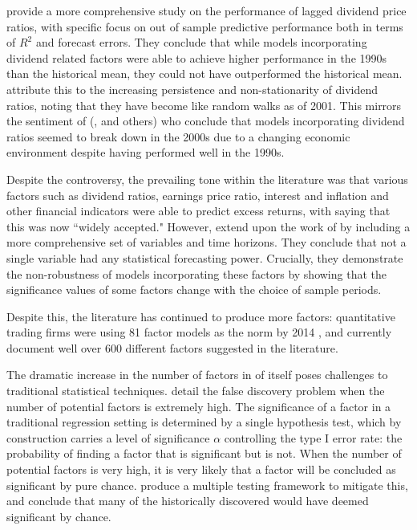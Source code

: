 \documentclass[a4paper, table]{article}
\begin{document}
\cite{goyal_predicting_2003} provide a more comprehensive study on the performance of lagged dividend price ratios, with specific focus on out of sample predictive performance both in terms of $R^2$ and forecast errors. They conclude that while models incorporating dividend related factors were able to achieve higher performance in the 1990s than the historical mean, they could not have outperformed the historical mean. \cite{goyal_predicting_2003} attribute this to the increasing persistence and non-stationarity of dividend ratios, noting that they have become like random walks as of 2001. This mirrors the sentiment of (\cite{lettau_consumption_2001}, \cite{schwert_anomalies_2003} and others) who conclude that models incorporating dividend ratios seemed to break down in the 2000s due to a changing economic environment despite having performed well in the 1990s.

Despite the controversy, the prevailing tone within the literature was that various factors such as dividend ratios, earnings price ratio, interest and inflation and other financial indicators were able to predict excess returns, with \cite{lettau_consumption_2001} saying that this was now ``widely accepted." However, \cite{welch_comprehensive_2008} extend upon the work of \cite{goyal_predicting_2003} by including a more comprehensive set of variables and time horizons. They conclude that not a single variable had any statistical forecasting power. Crucially, they demonstrate the non-robustness of models incorporating these factors by showing that the significance values of some factors change with the choice of sample periods.

Despite this, the literature has continued to produce more factors: quantitative trading firms were using 81 factor models as the norm by 2014 \citep{hsu_finding_2014}, and \cite{harvey_census_2019} currently document well over 600 different factors suggested in the literature. 

The dramatic increase in the number of factors in of itself poses challenges to traditional statistical techniques. \cite{harvey__2016} detail the false discovery problem when the number of potential factors is extremely high. The significance of a factor in a traditional regression setting is determined by a single hypothesis test, which by construction carries a level of significance $\alpha$ controlling the type I error rate: the probability of finding a factor that is significant but is not. When the number of potential factors is very high, it is very likely that a factor will be concluded as significant by pure chance. \cite{harvey__2016} produce a multiple testing framework to mitigate this, and conclude that many of the historically discovered would have deemed significant by chance.
\end{document}
